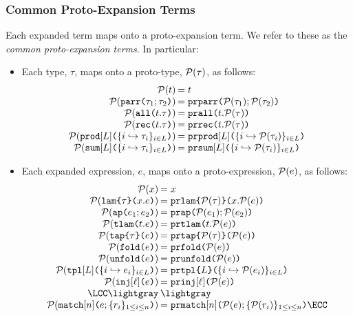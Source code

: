 \subsubsection{Common Proto-Expansion Terms} Each expanded term maps onto a proto-expansion term. We refer to these as the \emph{common proto-expansion terms}. In particular:
\begin{itemize}
  \item Each type, $\tau$, maps onto a proto-type, $\mathcal{P}(\tau)$, as follows:
  \[\arraycolsep=1pt\begin{array}{rl}
  \Cof{t} & = t\\
  \Cof{\aparr{\tau_1}{\tau_2}} & = \aceparr{\Cof{\tau_1}}{\Cof{\tau_2}}\\
  \Cof{\aall{t}{\tau}} & = \aceall{t}{\Cof{\tau}}\\
  \Cof{\arec{t}{\tau}} & = \acerec{t}{\Cof{\tau}}\\
  \Cof{\aprod{\labelset}{\mapschema{\tau}{i}{\labelset}}} & = \aceprod{\labelset}{\mapschemax{\Cofv}{\tau}{i}{\labelset}}\\
  \Cof{\asum{\labelset}{\mapschema{\tau}{i}{\labelset}}} & = \acesum{\labelset}{\mapschemax{\Cofv}{\tau}{i}{\labelset}}
  \end{array}\]
  \item Each expanded expression, $e$, maps onto a proto-expression, $\mathcal{P}(e)$, as follows:
  \[\arraycolsep=1pt\begin{array}{rl}
  \Cof{x} & = x\\
  \Cof{\aelam{\tau}{x}{e}} & = \acelam{\Cof{\tau}}{x}{\Cof{e}}\\
  \Cof{\aeap{e_1}{e_2}} & = \aceap{\Cof{e_1}}{\Cof{e_2}}\\
  \Cof{\aetlam{t}{e}} & = \acetlam{t}{\Cof{e}}\\
  \Cof{\aetap{e}{\tau}} & = \acetap{\Cof{e}}{\Cof{\tau}}\\
  \Cof{\aefold{e}} & = \acefold{\Cof e}\\
  \Cof{\aeunfold{e}} & = \aceunfold{\Cof{e}}\\
  \Cof{\aetpl{\labelset}{\mapschema{e}{i}{\labelset}}} & = \acetpl{\labelset}{\mapschemax{\Cofv}{e}{i}{\labelset}}\\
  \Cof{\aein{\ell}{e}} &= \acein{\ell}{\Cof{e}}\\
  \LCC \lightgray & \lightgray \\
  \Cof{\aematchwith{n}{e}{\seqschemaX{r}}} & = \acematchwith{n}{\Cof{e}}{\seqschemaXx{\Cofv}{r}} \ECC
  \end{array}\]
  \end{itemize}
